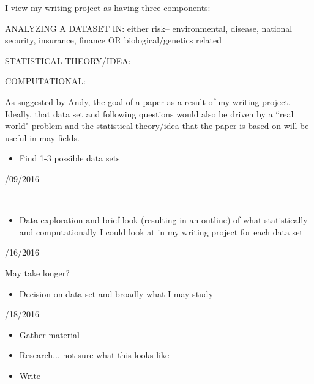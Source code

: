 \documentclass[12pt]{article}
\begin{document}
I view my writing project as having three components:

ANALYZING A DATASET IN: either risk-- environmental, disease, national security, insurance, finance OR biological/genetics related

STATISTICAL THEORY/IDEA:

COMPUTATIONAL:

As suggested by Andy, the goal of a paper as a result of my writing project. Ideally, that data set and following questions would also be driven by a ``real world" problem and the statistical theory/idea that the paper is based on will be useful in may fields.

\begin{minipage}{7cm}
\flushright
\begin{itemize}
\item Find 1-3 possible data sets
\end{itemize}
\end{minipage}
\begin{minipage}{7cm}
/09/2016
\end{minipage}\\


\begin{minipage}{7cm}
\flushright
\begin{itemize}
\item Data exploration and brief look (resulting in an outline) of what statistically and computationally I could look at in my writing project for each data set
\end{itemize}
\end{minipage}
\begin{minipage}{7cm}
/16/2016 

May take longer?
\end{minipage}


\begin{minipage}{7cm}
\flushright
\begin{itemize}
\item Decision on data set and broadly what I may study
\end{itemize}
\end{minipage}
\begin{minipage}{7cm}
/18/2016 
\end{minipage}

\begin{minipage}{7cm}
\begin{itemize}
\item Gather material

\item Research... not sure what this looks like

\item Write\\
\end{itemize}
\end{minipage}
\end{document}
